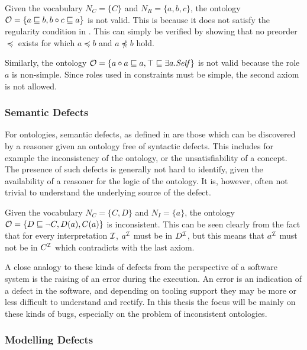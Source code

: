 \begin{example}
Given the vocabulary $N_C = \{ C \}$ and $N_R = \{ a, b, c \}$, the \SROIQ ontology $\mathcal{O} = \{ a \sqsubseteq b, b \circ c \sqsubseteq a \}$ is not valid. This is because it does not satisfy the regularity condition in \SROIQ. This can simply be verified by showing that no preorder $\preceq$ exists for which $a \preceq b$ and $a \not\preceq b$ hold.

Similarly, the ontology $\mathcal{O} = \{ a \circ a \sqsubseteq a, \top \sqsubseteq \exists a.\mathit{Self} \}$ is not valid because the role $a$ is non-simple. Since roles used in \self constraints must be simple, the second axiom is not allowed.
\end{example}

\subsubsection{Semantic Defects} \label{semantic-defects}

For ontologies, semantic defects, as defined in \cite{kalyanpur2005debugging}  are those which can be discovered by a reasoner given an ontology free of syntactic defects. This includes for example the inconsistency of the ontology, or the unsatisfiability of a concept. The presence of such defects is generally not hard to identify, given the availability of a reasoner for the logic of the ontology. It is, however, often not trivial to understand the underlying source of the defect.

\begin{example}
Given the vocabulary $N_C = \{ C, D \}$ and $N_I = \{ a \}$, the \SROIQ ontology $\mathcal{O} = \{ D \sqsubseteq \lnot C, D(a), C(a) \}$ is inconsistent. This can be seen clearly from the fact that for every interpretation $\mathcal{I}$, $a^\mathcal{I}$ must be in $D^\mathcal{I}$, but this means that $a^\mathcal{I}$ must not be in $C^\mathcal{I}$ which contradicts with the last axiom.
\end{example}

A close analogy to these kinds of defects from the perspective of a software system is the raising of an error during the execution. An error is an indication of a defect in the software, and depending on tooling support they may be more or less difficult to understand and rectify. In this thesis the focus will be mainly on these kinds of bugs, especially on the problem of inconsistent ontologies.

\subsubsection{Modelling Defects} \label{modelling-defects}

